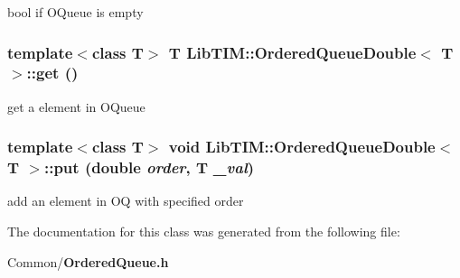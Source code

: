 bool if OQueue is empty 

\subsubsection{\setlength{\rightskip}{0pt plus 5cm}template$<$class T$>$ T {\bf Lib\-TIM::Ordered\-Queue\-Double}$<$ T $>$::get ()\hspace{0.3cm}{\tt  [inline]}}\label{classLibTIM_1_1OrderedQueueDouble_a3}


get a element in OQueue 

\subsubsection{\setlength{\rightskip}{0pt plus 5cm}template$<$class T$>$ void {\bf Lib\-TIM::Ordered\-Queue\-Double}$<$ T $>$::put (double {\em order}, T {\em \_\-val})\hspace{0.3cm}{\tt  [inline]}}\label{classLibTIM_1_1OrderedQueueDouble_a2}


add an element in OQ with specified order 



The documentation for this class was generated from the following file:\begin{CompactItemize}
\item 
Common/{\bf Ordered\-Queue.h}\end{CompactItemize}
